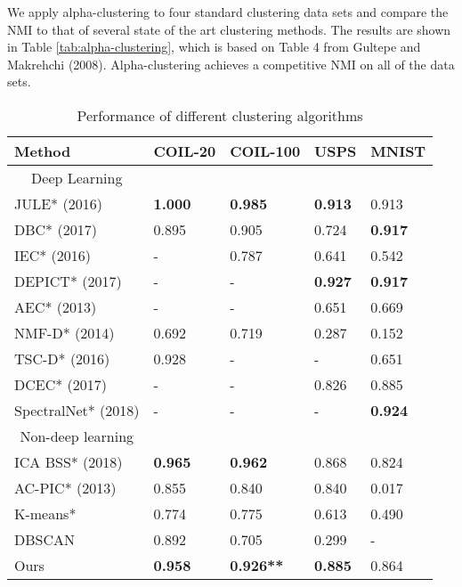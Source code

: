 \documentclass{article}
\begin{document}
We apply alpha-clustering to four standard clustering data sets and compare the NMI to that of several state of the art clustering methods. The results are shown in Table \ref{tab:alpha-clustering}, which is based on Table 4 from Gultepe and Makrehchi (2008). Alpha-clustering achieves a competitive NMI on all of the data sets.

\begin{table}[H]
 \caption{Performance of different clustering algorithms}
  \centering
  \begin{tabular}{lllll}
    \toprule
    Method     & COIL-20     & COIL-100     & USPS & MNIST \\
    \midrule
    \multicolumn{1}{c}{Deep Learning} \\
    \cmidrule(r){1-1}
    JULE* (2016) & \bf 1.000  & \bf 0.985    & \bf 0.913 & 0.913     \\
    DBC* (2017)     & 0.895  & 0.905 & 0.724 & \bf 0.917  \\
    IEC* (2016)    & - & 0.787 & 0.641 & 0.542      \\
    DEPICT* (2017)    & - & - & \bf 0.927 & \bf 0.917     \\
    AEC* (2013)  & - & - & 0.651 & 0.669 \\
    NMF-D* (2014) & 0.692 & 0.719 & 0.287 & 0.152 \\
    TSC-D* (2016) & 0.928 & - & - & 0.651 \\
    DCEC* (2017) & - & - & 0.826 & 0.885 \\
    SpectralNet* (2018) & - & - & - & \bf 0.924 \\
    \cmidrule(r){1-1}
    \multicolumn{1}{c}{Non-deep learning} \\
    \cmidrule(r){1-1}
    ICA BSS* (2018)     & \bf 0.965 & \bf 0.962 & 0.868 & 0.824      \\
    AC-PIC* (2013)     & 0.855 & 0.840 & 0.840 & 0.017      \\
    K-means* & 0.774 & 0.775 & 0.613 & 0.490 \\ DBSCAN & 0.892 & 0.705 & 0.299 & - \\
    \cmidrule(r){1-1}
    Ours        & \bf 0.958 & \bf 0.926** & \bf 0.885 & 0.864 \\ 
    \bottomrule
  \end{tabular}
  \captionsetup{width=.9\linewidth}

\end{table}
\end{document}
